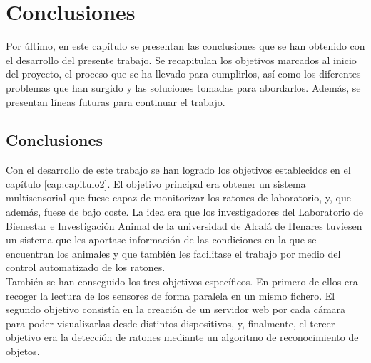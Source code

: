\chapter{Conclusiones}
\label{cap:capitulo5}



\vspace{1cm}
Por último, en este capítulo se presentan las conclusiones que se han obtenido con el desarrollo del presente trabajo. Se recapitulan los objetivos marcados al inicio del proyecto, el proceso que se ha llevado para cumplirlos, así como los diferentes problemas que han surgido y las soluciones tomadas para abordarlos. Además, se presentan líneas futuras para continuar el trabajo.\\

\section{Conclusiones}
Con el desarrollo de este trabajo se han logrado los objetivos establecidos en el capítulo \ref{cap:capitulo2}. El objetivo principal era obtener un sistema multisensorial que fuese capaz de monitorizar los ratones de laboratorio, y, que además, fuese de bajo coste. La idea era que los investigadores del Laboratorio de Bienestar e Investigación Animal de la universidad de Alcalá de Henares tuviesen un sistema que les aportase información de las condiciones en la que se encuentran los animales y que también les facilitase el trabajo por medio del control automatizado de los ratones.\\

También se han conseguido los tres objetivos específicos. En primero de ellos era recoger la lectura de los sensores de forma paralela en un mismo fichero. El segundo objetivo consistía en la creación de un servidor web por cada cámara para poder visualizarlas desde distintos dispositivos, y, finalmente, el tercer objetivo era la detección de ratones mediante un algoritmo de reconocimiento de objetos.\\

